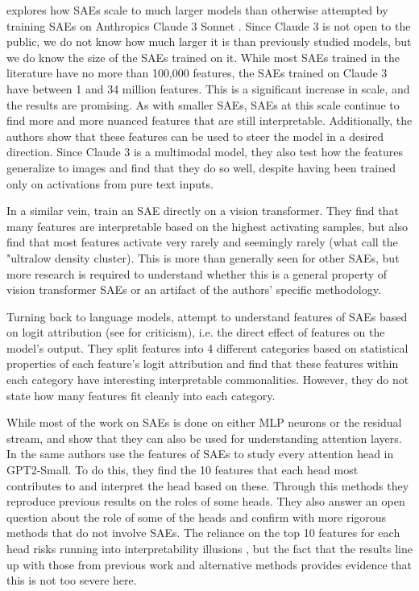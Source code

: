 \cite{templeton_scaling_2024} explores how SAEs scale to much larger models than otherwise attempted by training SAEs on Anthropics Claude 3 Sonnet \cite{anthropic_introducing_2024}.
Since Claude 3 is not open to the public, we do not know how much larger it is than previously studied models, but we do know the size of the SAEs trained on it.
While most SAEs trained in the literature have no more than 100,000 features, the SAEs trained on Claude 3 have between 1 and 34 million features.
This is a significant increase in scale, and the results are promising.
As with smaller SAEs, SAEs at this scale continue to find more and more nuanced features that are still interpretable.
Additionally, the authors show that these features can be used to steer the model in a desired direction.
Since Claude 3 is a multimodal model, they also test how the features generalize to images and find that they do so well, despite having been trained only on activations from pure text inputs.

In a similar vein, \cite{fry_towards_2024} train an SAE directly on a vision transformer.
They find that many features are interpretable based on the highest activating samples, but also find that most features activate very rarely and seemingly rarely (what \cite{bricken_towards_2023} call the "ultralow density cluster).
This is more than generally seen for other SAEs, but more research is required to understand whether this is a general property of vision transformer SAEs or an artifact of the authors' specific methodology.

Turning back to language models, \cite{bloom_understanding_2024} attempt to understand features of SAEs based on logit attribution \cite{nostalgebraist_interpreting_2020} (see \cite{dao_adversarial_2023} for criticism), i.e. the direct effect of features on the model's output.
They split features into 4 different categories based on statistical properties of each feature's logit attribution and find that these features within each category have interesting interpretable commonalities.
However, they do not state how many features fit cleanly into each category.

While most of the work on SAEs is done on either MLP neurons or the residual stream, \cite{kissane_sparse_2024} and \cite{kissane_attention_2024} show that they can also be used for understanding attention layers.
In \cite{krzyzanowski_we_2024} the same authors use the features of SAEs to study every attention head in GPT2-Small.
To do this, they find the 10 features that each head most contributes to and interpret the head based on these.
Through this methods they reproduce previous results on the roles of some heads.
They also answer an open question about the role of some of the heads and confirm with more rigorous methods that do not involve SAEs.
The reliance on the top 10 features for each head risks running into interpretability illusions \cite{bolukbasi_interpretability_2021}, but the fact that the results line up with those from previous work and alternative methods provides evidence that this is not too severe here. 

